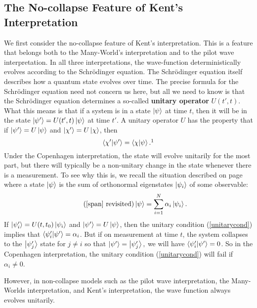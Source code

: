 \subsection{The No-collapse Feature of Kent's Interpretation}
We first consider the no-collapse feature of Kent's interpretation. This is a feature that belongs both to the Many-World's interpretation and to the pilot wave interpretation. In all three interpretations, the wave-function deterministically evolves according to the Schr\"{o}dinger equation. The Schr\"{o}dinger equation itself describes how a quantum state evolves over time. The precise formula for the Schr\"{o}dinger equation need not concern us here, but all we need to know is that the Schr\"{o}dinger equation determines a so-called \textbf{unitary operator} $U(t',t)$. What this means is that if a system is in a state $\ket{\psi}$ at time $t$, then it will be in the state $\ket{\psi'}=U(t',t)\ket{\psi}$
at time $t'$. A unitary operator $U$ has the property that if $\ket{\psi'}=U\ket{\psi}$ and $\ket{\chi'}=U\ket{\chi}$, then 
\begin{equation}\label{unitarycond}
\ip{\chi'}{\psi'}=\ip{\chi}{\psi}.\protect\footnotemark
\end{equation}
Under the Copenhagen interpretation, the state will evolve unitarily for the most part, but there will typically be a non-unitary change in the state whenever there is a measurement. To see why this is, we recall the situation described on page \pageref{span} where a state $\ket{\psi}$ is the sum of orthonormal eigenstates $\ket{\psi_i}$ of some observable: 
\begin{equation}\tag{\ref{span} revisited}
\ket{\psi}=\sum_{i=1}^N\alpha_i\ket{\psi_i}.
\end{equation}
If $\ket{\psi_i'}=U(t,t_0)\ket{\psi_i}$ and $\ket{\psi'}=U\ket{\psi}$, then the unitary condition (\ref{unitarycond}) implies that 
$\ip{\psi'_i}{\psi'}=\alpha_i$. But if on measurement at time $t$, the system collapses to the $\ket{\psi'_j}$ state for $j\neq i$ so that $\ket{\psi'}=\ket{\psi_j'},$ we will have $\ip{\psi'_i}{\psi'}=0$. So in the Copenhagen interpretation, the unitary condition (\ref{unitarycond})  will fail if $\alpha_i\neq 0$. 

However, in non-collapse models  such as the pilot wave interpretation, the Many-Worlds interpretation, and Kent's interpretation, the wave function always evolves unitarily. 

